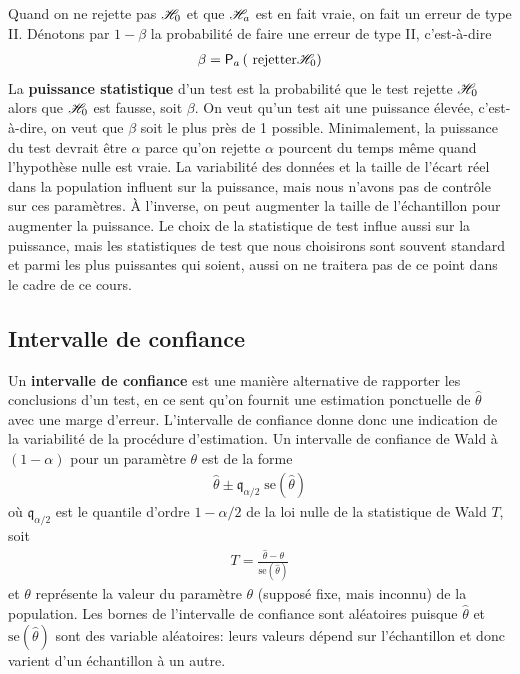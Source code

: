 \documentclass[
  11pt,
  letterpaper,
]{book}
\begin{document}
Quand on ne rejette pas \(\Hy_0\) et que \(\Hy_a\) est en fait vraie, on fait un erreur de type II. Dénotons par \(1-\beta\) la probabilité de faire une erreur de type II, c'est-à-dire
\begin{align*}
\beta = \pr[a]{\text{ rejetter} \Hy_0}
\end{align*}
La \textbf{puissance statistique} d'un test est la probabilité que le test rejette \(\Hy_0\) alors que \(\Hy_0\) est fausse, soit \(\beta\). On veut qu'un test ait une puissance élevée, c'est-à-dire, on veut que \(\beta\) soit le plus près de 1 possible. Minimalement, la puissance du test devrait être \(\alpha\) parce qu'on rejette \(\alpha\) pourcent du temps même quand l'hypothèse nulle est vraie. La variabilité des données et la taille de l'écart réel dans la population influent sur la puissance, mais nous n'avons pas de contrôle sur ces paramètres. À l'inverse, on peut augmenter la taille de l'échantillon pour augmenter la puissance. Le choix de la statistique de test influe aussi sur la puissance, mais les statistiques de test que nous choisirons sont souvent standard et parmi les plus puissantes qui soient, aussi on ne traitera pas de ce point dans le cadre de ce cours.

\hypertarget{intervalle-de-confiance}{%
\subsection{Intervalle de confiance}\label{intervalle-de-confiance}}

Un \textbf{intervalle de confiance} est une manière alternative de rapporter les conclusions d'un test, en ce sent qu'on fournit une estimation ponctuelle de \(\hat{\theta}\) avec une marge d'erreur. L'intervalle de confiance donne donc une indication de la variabilité de la procédure d'estimation. Un intervalle de confiance de Wald à \((1-\alpha)\) pour un paramètre \(\theta\) est de la forme
\begin{align*}
\widehat{\theta} \pm \mathfrak{q}_{\alpha/2} \; \mathrm{se}(\widehat{\theta})
\end{align*}
où \(\mathfrak{q}_{\alpha/2}\) est le quantile d'ordre \(1-\alpha/2\) de la loi nulle de la statistique de Wald \(T\), soit
\begin{align*}
T =\frac{\widehat{\theta}-\theta}{\mathrm{se}(\widehat{\theta})}
\end{align*}
et \(\theta\) représente la valeur du paramètre \(\theta\) (supposé fixe, mais inconnu) de la population. Les bornes de l'intervalle de confiance sont aléatoires puisque \(\widehat{\theta}\) et \(\mathrm{se}(\widehat{\theta})\) sont des variable aléatoires: leurs valeurs dépend sur l'échantillon et donc varient d'un échantillon à un autre.
\end{document}

